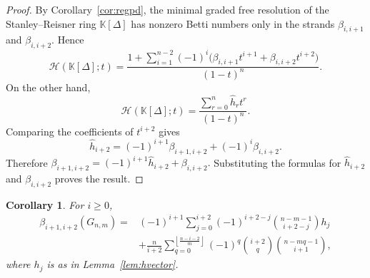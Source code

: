 \documentclass[12pt,reqno]{amsart}
\newtheorem{corollary}[theorem]{Corollary}
\theoremstyle{definition}
\numberwithin{equation}{section}
\def\K{\mathbb{K}}
\begin{document}
\begin{proof}
By Corollary~\ref{cor:regpd}, the minimal graded free resolution of the
Stanley--Reisner ring $\K[\Delta]$ has nonzero Betti numbers only in the
strands $\beta_{i,i+1}$ and $\beta_{i,i+2}$. Hence
\[
\mathcal{H}(\K[\Delta];t)
=
\frac{
1+\sum_{i=1}^{n-2}(-1)^i
\big(\beta_{i,i+1}t^{i+1}+\beta_{i,i+2}t^{i+2}\big)
}{(1-t)^n}.
\]
On the other hand,
\[
\mathcal{H}(\K[\Delta];t)
=
\frac{\sum_{r=0}^{n}\widehat h_rt^r}{(1-t)^n}.
\]
Comparing the coefficients of $t^{i+2}$ gives
\[
\widehat h_{i+2}
=
(-1)^{i+1}\beta_{i+1,i+2}
+
(-1)^i\beta_{i,i+2}.
\]
Therefore \( \beta_{i+1,i+2}
=
(-1)^{i+1}\widehat h_{i+2}
+
\beta_{i,i+2}. \)
Substituting the formulas for $\widehat h_{i+2}$ and
$\beta_{i,i+2}$ proves the result.
\end{proof}
\begin{corollary}
	For $i\geq0$,
	\[
	\begin{aligned}
		\beta_{i+1,i+2}(G_{n,m})
		={}&
		(-1)^{i+1}
		\sum_{j=0}^{i+2}
		(-1)^{i+2-j}
		\binom{n-m-1}{i+2-j}h_j\\
		&+
		\frac{n}{i+2}
		\sum_{q=0}^{\left\lfloor\frac{n-i-2}{m}\right\rfloor}
		(-1)^q
		\binom{i+2}{q}
		\binom{n-mq-1}{i+1},
	\end{aligned}
	\]
	where $h_j$ is as in Lemma~\ref{lem:hvector}.

\end{corollary}
\end{document}
